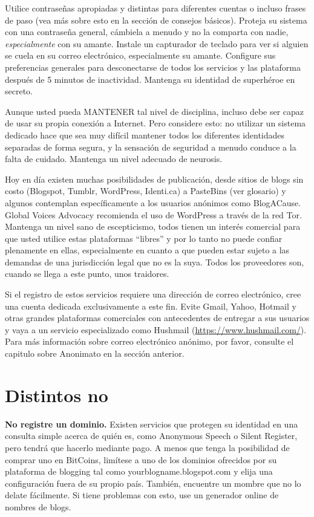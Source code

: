 \documentclass[10pt,a5paper,twoside,,]{book}
\begin{document}
Utilice contraseñas apropiadas y distintas para diferentes cuentas o
incluso frases de paso (vea más sobre esto en la sección de consejos
básicos). Proteja su sistema con una contraseña general, cámbiela a
menudo y no la comparta con nadie, \emph{especialmente} con su amante.
Instale un capturador de teclado para ver si alguien se cuela en su
correo electrónico, especialmente su amante. Configure sus preferencias
generales para desconectarse de todos los servicios y las plataforma
después de 5 minutos de inactividad. Mantenga su identidad de superhéroe
en secreto.

Aunque usted pueda MANTENER tal nivel de disciplina, incluso debe ser
capaz de usar su propia conexión a Internet. Pero considere esto: no
utilizar un sistema dedicado hace que sea muy difícil mantener todos los
diferentes identidades separadas de forma segura, y la sensación de
seguridad a menudo conduce a la falta de cuidado. Mantenga un nivel
adecuado de neurosis.

Hoy en día existen muchas posibilidades de publicación, desde sitios de
blogs sin costo (Blogspot, Tumblr, WordPress, Identi.ca) a PasteBins
(ver glosario) y algunos contemplan específicamente a los usuarios
anónimos como BlogACause. Global Voices Advocacy recomienda el uso de
WordPress a través de la red Tor. Mantenga un nivel sano de
escepticismo, todos tienen un interés comercial para que usted utilice
estas plataformas ``libres'' y por lo tanto no puede confiar plenamente
en ellas, especialmente en cuanto a que pueden estar sujeto a las
demandas de una jurisdicción legal que no es la suya. Todos los
proveedores son, cuando se llega a este punto, unos traidores.

Si el registro de estos servicios requiere una dirección de correo
electrónico, cree una cuenta dedicada exclusivamente a este fin. Evite
Gmail, Yahoo, Hotmail y otras grandes plataformas comerciales con
antecedentes de entregar a sus usuarios y vaya a un servicio
especializado como Hushmail (\url{https://www.hushmail.com/}). Para más
información sobre correo electrónico anónimo, por favor, consulte el
capitulo sobre Anonimato en la sección anterior.

\section{Distintos no}\label{distintos-no}

\textbf{No registre un dominio.} Existen servicios que protegen su
identidad en una consulta simple acerca de quién es, como Anonymous
Speech o Silent Register, pero tendrá que hacerlo mediante pago. A menos
que tenga la posibilidad de comprar uno en BitCoins, limítese a uno de
los dominios ofrecidos por su plataforma de blogging tal como
yourblogname.blogspot.com y elija una configuración fuera de su propio
país. También, encuentre un mombre que no lo delate fácilmente. Si tiene
problemas con esto, use un generador online de nombres de blogs.
\end{document}
